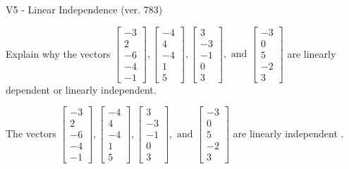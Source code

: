\begin{exercise}
  \begin{exerciseTitle}V5 - Linear Independence (ver. 783)\end{exerciseTitle}
  \begin{exerciseStatement}
    Explain why the vectors \(\left[\begin{array}{r}
-3 \\
2 \\
-6 \\
-4 \\
-1
\end{array}\right] , \left[\begin{array}{r}
-4 \\
4 \\
-4 \\
1 \\
5
\end{array}\right] , \left[\begin{array}{r}
3 \\
-3 \\
-1 \\
0 \\
3
\end{array}\right] , \text{ and } \left[\begin{array}{r}
-3 \\
0 \\
5 \\
-2 \\
3
\end{array}\right]\) are linearly dependent or linearly independent.	


  \end{exerciseStatement}
  \begin{exerciseAnswer}
   The vectors \(\left[\begin{array}{r}
-3 \\
2 \\
-6 \\
-4 \\
-1
\end{array}\right] , \left[\begin{array}{r}
-4 \\
4 \\
-4 \\
1 \\
5
\end{array}\right] , \left[\begin{array}{r}
3 \\
-3 \\
-1 \\
0 \\
3
\end{array}\right] , \text{ and } \left[\begin{array}{r}
-3 \\
0 \\
5 \\
-2 \\
3
\end{array}\right]\) are 
  	 linearly independent  .
  


  \end{exerciseAnswer}
\end{exercise}